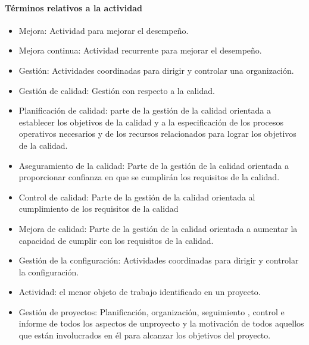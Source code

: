 					\paragraph{Términos relativos a la actividad}
						\begin{itemize}
							\item Mejora: Actividad para mejorar el desempeño.
							
							\item Mejora continua: Actividad recurrente para mejorar el desempeño.
							
							\item Gestión: Actividades coordinadas para dirigir y controlar una organización.
							
							\item Gestión de calidad: Gestión con respecto a la calidad.
							
							\item Planificación de calidad: parte de la gestión de la calidad orientada a establecer los objetivos de la calidad y a la
							especificación de los procesos operativos necesarios y de los recursos relacionados para lograr
							los objetivos de la calidad.
							
							\item Aseguramiento de la calidad: Parte de la gestión de la calidad orientada a proporcionar confianza en que se cumplirán los
							requisitos de la calidad.
							
							\item Control de calidad: Parte de la gestión de la calidad orientada al cumplimiento de los requisitos de la calidad
							
							\item Mejora de calidad: Parte de la gestión de la calidad orientada a aumentar la capacidad de cumplir con los
							requisitos de la calidad.
							
							\item Gestión de la configuración: Actividades coordinadas para dirigir y controlar la configuración.
							
							\item Actividad: el menor objeto de trabajo identificado en un proyecto. 
							
							\item Gestión de proyectos: Planificación, organización, seguimiento , control e informe de todos los aspectos de unproyecto y la motivación de todos aquellos que están involucrados en él para alcanzar los objetivos del proyecto.
							
						\end{itemize}
					
